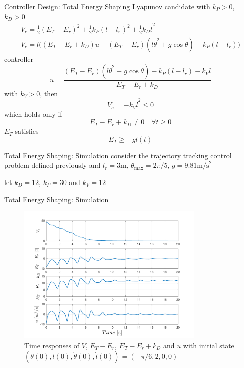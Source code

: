 \documentclass[10pt]{beamer}
\begin{document}
  \begin{frame}{Controller Design: Total Energy Shaping}
    Lyapunov candidate with $k_P>0$, $k_D>0$
    \begin{gather*}
      V_c = \frac{1}{2}(E_T-E_r)^2+\frac{1}{2}k_P(l-l_r)^2+
        \frac{1}{2}k_D\dot{l}^2 \\
      \dot{V}_c = \dot{l}\big((E_T-E_r+k_D)u-(E_T-E_r)(l\dot{\theta}^2+
        g\cos\theta)-k_P(l-l_r) \big)
    \end{gather*}
    controller
    \begin{equation*}
      u = \frac{(E_T-E_r)(l\dot{\theta}^2+g\cos\theta)-k_P(l-l_r)-
        k_V\dot{l}}{E_T-E_r+k_D}
    \end{equation*}
    with $k_V>0$, then
    \begin{equation*}
      \dot{V}_c = -k_V\dot{l}^2 \leq 0
    \end{equation*}
    which holds only if
    \begin{equation*}
      E_T-E_r+k_D  \neq 0 \quad \forall t\geq 0
    \end{equation*}
    $E_T$ satisfies
    \begin{equation*}
      E_T \geq -gl(t)
    \end{equation*}
  \end{frame}

  \begin{frame}{Total Energy Shaping: Simulation}
    consider the trajectory tracking control problem defined previously
    and $l_r=3\text{m}$, $\theta_{\max}=2\pi/5$, $g=9.81\text{m/s}^2$
    
    \vspace{1cm}
    
    let $k_D=12$, $k_P=30$ and $k_V=12$
  \end{frame}

  \begin{frame}{Total Energy Shaping: Simulation}
    \begin{figure}
      \caption*{Time responses of $V$, $E_T-E_r$, $E_T-E_r+k_D$ and $u$
        with initial state
        $(\theta(0),l(0),\dot{\theta}(0),\dot{l}(0)) = (-\pi/6,2,0,0)$}
      \vspace{-0.3cm}
      \includegraphics[width=0.8\textwidth]{images/total_1b.pdf}
    \end{figure}
  \end{frame}
\end{document}

